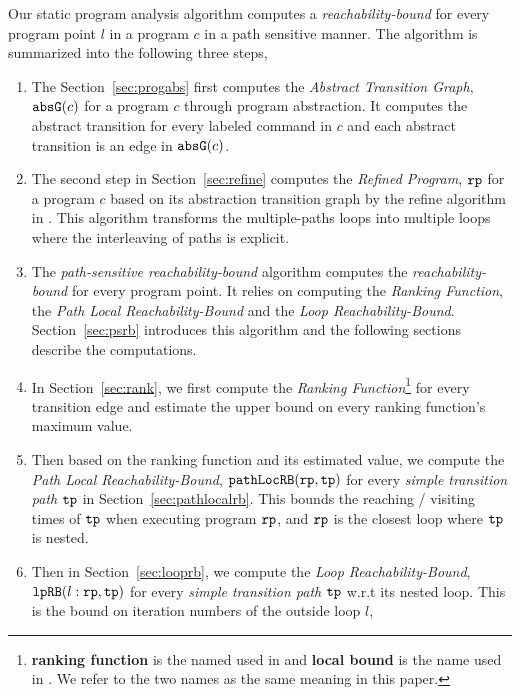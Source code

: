 Our static program analysis algorithm computes 
a \emph{reachability-bound} for every program point $l$ in a program $c$ in a path sensitive manner.
The algorithm is summarized into the following three steps,
\begin{enumerate}
\item  The Section~\ref{sec:progabs} first 
computes the \emph{Abstract Transition Graph}, $\mathtt{abs}{\mathtt{G}}(c)$ for a program $c$ through program abstraction.
It computes the abstract transition 
for every labeled command in $c$ and each abstract transition is an edge in $\mathtt{abs}{\mathtt{G}}(c)$.
\item The second step in Section~\ref{sec:refine}
computes the \emph{Refined Program}, $\mathtt{rp}$ for a program $c$ based on 
its abstraction transition graph by the refine algorithm in \cite{GulwaniJK09}.
This algorithm transforms the multiple-paths loops
into multiple loops where
the interleaving of paths is explicit.
\item The \emph{path-sensitive reachability-bound} algorithm computes the \emph{reachability-bound} for every program point.
It relies on computing the \emph{Ranking Function}, the \emph{Path Local Reachability-Bound} and the \emph{Loop Reachability-Bound}.
Section~\ref{sec:psrb} introduces this algorithm and the following sections describe the computations. 
    \item In Section~\ref{sec:rank}, we first compute the \emph{Ranking Function}\footnote{\textbf{ranking function} is the named used in \cite{SinnZV14}
    and \textbf{local bound} is the name used in \cite{ZulegerGSV11, SinnZV17}.
    We refer to the two names as the same meaning in this paper.}  for every transition edge 
    and estimate the upper bound on every ranking function's maximum value.
    \item Then based on the ranking function and its estimated value, we compute the \emph{Path Local Reachability-Bound}, $\mathtt{pathLocRB}(\mathtt{rp}, \mathtt{tp})$ for every \emph{simple transition path} $\mathtt{tp}$ in Section~\ref{sec:pathlocalrb}. 
    This bounds the reaching / visiting times of $\mathtt{tp}$ when executing program $\mathtt{rp}$, and $\mathtt{rp}$ is the closest loop where $\mathtt{tp}$ is nested.
    \item Then in Section~\ref{sec:looprb}, we compute the \emph{Loop Reachability-Bound}, $\mathtt{lpRB}(l: \mathtt{rp}, \mathtt{tp})$ for every \emph{simple transition path} $\mathtt{tp}$
    w.r.t its nested loop. 
    This is the bound on iteration numbers of the outside loop $l$,

\end{enumerate}
